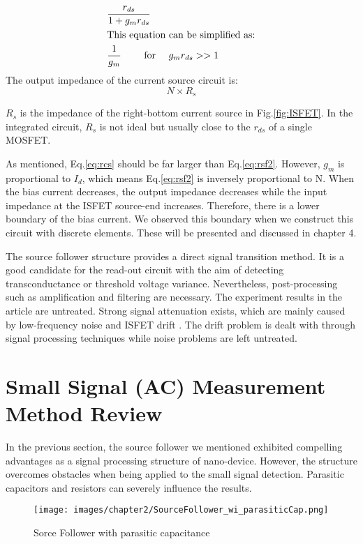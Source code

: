\begin{align}
    & \frac{r_{ds}}{1 + g_mr_{ds}}\\
\intertext{This equation can be simplified as:}
    & \frac{1}{g_m} \qquad \text{ for } \quad g_mr_{ds} >> 1 \label{eq:rsf2}
\end{align}
The output impedance of the current source circuit is:
\begin{equation} \label{eq:rcs}
    N\times R_s
\end{equation}

$R_s$ is the impedance of the right-bottom current source in Fig.\ref{fig:ISFET}.
In the integrated circuit, $R_s$ is not ideal but usually close to the $r_{ds}$ of a single MOSFET.

As mentioned, Eq.\ref{eq:rcs} should be far larger than Eq.\ref{eq:rsf2}.
However, $g_m$ is proportional to $I_d$, which means Eq.\ref{eq:rsf2} is inversely proportional to N.
When the bias current decreases, the output impedance decreases while the input impedance at the ISFET source-end increases.
Therefore, there is a lower boundary of the bias current.
We observed this boundary when we construct this circuit with discrete elements.
These will be presented and discussed in chapter 4.

The source follower structure provides a direct signal transition method.
It is a good candidate for the read-out circuit with the aim of detecting transconductance or threshold voltage variance.
Nevertheless, post-processing such as amplification and filtering are necessary.
The experiment results in the article are untreated.
Strong signal attenuation exists, which are mainly caused by low-frequency noise and ISFET drift \cite{Drift}.
The drift problem is dealt with through signal processing techniques while noise problems are left untreated.


\section{Small Signal (AC) Measurement Method Review}
In the previous section, the source follower we mentioned exhibited compelling advantages as a signal processing structure of nano-device.
However, the structure overcomes obstacles when being applied to the small signal detection.
Parasitic capacitors and resistors can severely influence the results.

\begin{figure}[ht]
    \centering
    \texttt{[image: images/chapter2/SourceFollower\_wi\_parasiticCap.png]}
    \fontsize{6}{7}\selectfont
    \caption{Sorce Follower with parasitic capacitance}
    \label{fig:SF_pC}
\end{figure}

